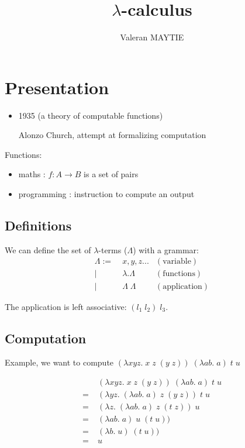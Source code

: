 \documentclass{article}
\title{$\lambda$-calculus}
\author{Valeran MAYTIE}
\date{}
\theoremstyle{plain}
\theoremstyle{plain}
\begin{document}
  \maketitle

  \section{Presentation}

  \begin{itemize}
    \item 1935 (a theory of computable functions)

      Alonzo Church, attempt at formalizing computation
  \end{itemize}

  Functions:
  \begin{itemize}
    \item maths : $f : A \to B$ is a set of pairs
    \item programming : instruction to compute an output
  \end{itemize}

  \subsection{Definitions}

  We can define the set of $\lambda$-terms ($\Lambda$) with a grammar:
  \begin{align*}
    \Lambda :=&\; x, y, z ...         & (\text{variable}) \\
             |&\; \lambda. \Lambda    & (\text{functions}) \\
             |&\; \Lambda\; \Lambda   & (\text{application})
  \end{align*}

  The application is left associative: $(l_1\; l_2)\; l_3$.

  \subsection{Computation}

  Example, we want to compute $(\lambda x y z.\; x\; z\; (y\; z))\; (\lambda a
  b.\; a)\; t\; u$

  \begin{align*}
    &\;(\lambda x y z.\; x\; z\; (y\; z))\; (\lambda a b.\; a)\; t\; u \\
    =&\;(\lambda y z.\; (\lambda a b.\; a)\; z\; (y\; z))\; t\; u \\
    =&\;(\lambda z.\; (\lambda a b.\; a)\; z\; (t\; z))\; u \\
    =&\;(\lambda a b.\; a)\; u\; (t\; u))\\
    =&\;(\lambda b.\; u)\; (t\; u))\\
    =&\;u
  \end{align*}
\end{document}
